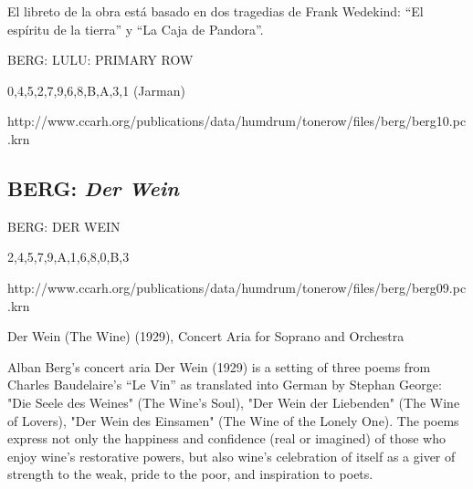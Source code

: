        El libreto de la obra está basado en dos tragedias de Frank Wedekind: ``El espíritu de la tierra'' y ``La Caja de Pandora''. 
        
        
        
        
        
        BERG: LULU: PRIMARY ROW
        
        {0,4,5,2,7,9,6,8,B,A,3,1} (Jarman)
        
        http://www.ccarh.org/publications/data/humdrum/tonerow/files/berg/berg10.pc.krn
        
        
        \subsection{BERG: \textit{Der Wein}}
        
        BERG: DER WEIN
        
        {2,4,5,7,9,A,1,6,8,0,B,3}
        
        http://www.ccarh.org/publications/data/humdrum/tonerow/files/berg/berg09.pc.krn
        
        Der Wein (The Wine) (1929), Concert Aria for Soprano and Orchestra
        
        Alban Berg's concert aria Der Wein (1929) is a setting of three poems from Charles Baudelaire's ``Le Vin'' as translated into German by Stephan George: "Die Seele des Weines" (The Wine's Soul), "Der Wein der Liebenden" (The Wine of Lovers), "Der Wein des Einsamen" (The Wine of the Lonely One). The poems express not only the happiness and confidence (real or imagined) of those who enjoy wine's restorative powers, but also wine's celebration of itself as a giver of strength to the weak, pride to the poor, and inspiration to poets.
        
